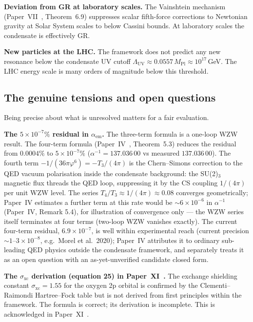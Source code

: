 \documentclass[11pt,a4paper]{article}
\newcommand{\vp}{\varphi}
\newcommand{\aem}{\alpha_{\mathrm{em}}}
\begin{document}
\textbf{Deviation from GR at laboratory scales.} The Vainshtein mechanism
(Paper~VII~\cite{Paper7}, Theorem~6.9) suppresses scalar fifth-force
corrections to Newtonian gravity at Solar System scales to below Cassini bounds.
At laboratory scales the condensate is effectively GR.

\textbf{New particles at the LHC.} The framework does not predict any new
resonance below the condensate UV cutoff $\Lambda_{\mathrm{UV}} \approx
0.0557\,M_{\mathrm{Pl}} \approx 10^{17}$\,GeV. The LHC energy scale is many
orders of magnitude below this threshold.

\subsection{The genuine tensions and open questions}

Being precise about what is unresolved matters for a fair evaluation.

\textbf{The $5\times10^{-7}\%$ residual in $\aem$.} The three-term formula is a
one-loop WZW result. The four-term formula (Paper~IV~\cite{Paper4}, Theorem~5.3)
reduces the residual from $0.0004\%$ to $5\times10^{-7}\%$
($\alpha^{-1} = 137.036\,00$ vs measured $137.036\,00$).
The fourth term $-1/(36\pi\vp^6) = -T_3/(4\pi)$ is the Chern--Simons
correction to the QED vacuum polarisation inside the condensate background:
the SU(2)$_3$ magnetic flux threads the QED loop, suppressing it by
the CS coupling $1/(4\pi)$ per unit WZW level.
The series $T_4/T_3 \approx 1/(4\pi) \approx 0.08$ converges geometrically;
Paper~IV estimates a further term at this rate would be
$\sim6\times10^{-6}$ in $\alpha^{-1}$ (Paper~IV, Remark 5.4), for
illustration of convergence only --- the WZW series itself terminates
at four terms (two-loop WZW vanishes exactly). The current four-term
residual, $6.9\times10^{-7}$, is well within experimental reach
(current precision $\sim1$--$3\times10^{-8}$, e.g.\ Morel et al.\ 2020);
Paper~IV attributes it to ordinary sub-leading QED physics outside the
condensate framework, and separately treats it as an open question with
an as-yet-unverified candidate closed form.

\textbf{The $\sigma_{\mathrm{xc}}$ derivation (equation 25) in Paper~XI~\cite{Paper11}.} The exchange shielding constant
$\sigma_{\mathrm{xc}} = 1.55$ for the oxygen 2p orbital is confirmed by the
Clementi--Raimondi Hartree--Fock table but is not derived from first principles
within the framework. The formula is correct; its derivation is incomplete. This
is acknowledged in Paper~XI~\cite{Paper11}.
\end{document}
